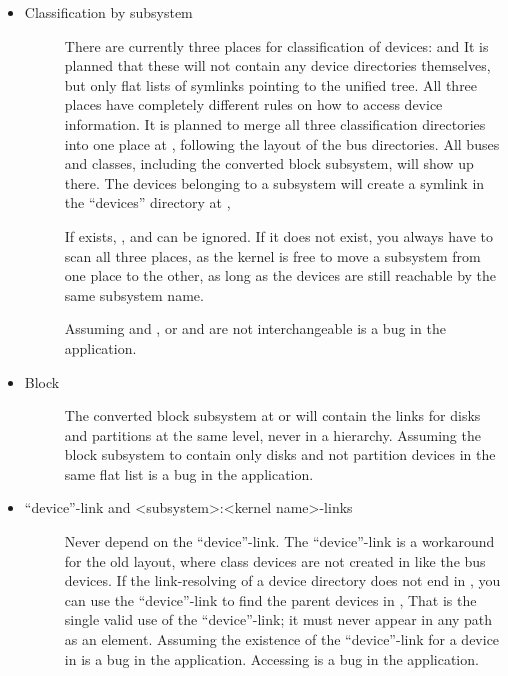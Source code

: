 \documentclass[a4paper,8pt,english]{sphinxmanual}
\begin{document}
\begin{itemize}
\item {} \begin{description}
\item[{Classification by subsystem}] \leavevmode
There are currently three places for classification of devices:
  and  It is planned that these will
not contain any device directories themselves, but only flat lists of
symlinks pointing to the unified  tree.
All three places have completely different rules on how to access
device information. It is planned to merge all three
classification directories into one place at ,
following the layout of the bus directories. All buses and
classes, including the converted block subsystem, will show up
there.
The devices belonging to a subsystem will create a symlink in the
``devices'' directory at ,

If  exists, ,  and 
can be ignored. If it does not exist, you always have to scan all three
places, as the kernel is free to move a subsystem from one place to
the other, as long as the devices are still reachable by the same
subsystem name.

Assuming  and , or
 and  are not interchangeable is a bug in
the application.

\end{description}

\item {} \begin{description}
\item[{Block}] \leavevmode
The converted block subsystem at  or
 will contain the links for disks and partitions
at the same level, never in a hierarchy. Assuming the block subsystem to
contain only disks and not partition devices in the same flat list is
a bug in the application.

\end{description}

\item {} \begin{description}
\item[{``device''-link and \textless{}subsystem\textgreater{}:\textless{}kernel name\textgreater{}-links}] \leavevmode
Never depend on the ``device''-link. The ``device''-link is a workaround
for the old layout, where class devices are not created in
 like the bus devices. If the link-resolving of a
device directory does not end in , you can use the
``device''-link to find the parent devices in , That is the
single valid use of the ``device''-link; it must never appear in any
path as an element. Assuming the existence of the ``device''-link for
a device in  is a bug in the application.
Accessing  is a bug in the application.


\end{description}
\end{itemize}
\end{document}
